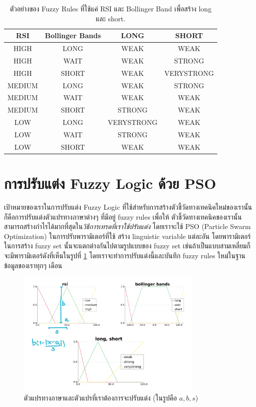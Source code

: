 \begin{table}[htp]
	\centering
	\begin{tabular}{c c c c}
		\toprule
        {RSI} & {Bollinger Bands} & {LONG} & {SHORT} \\ 
        \midrule
        HIGH & LONG & WEAK & WEAK \\
        HIGH & WAIT & WEAK & STRONG \\
        HIGH & SHORT & WEAK & VERYSTRONG \\
        MEDIUM & LONG & WEAK & STRONG \\
        MEDIUM & WAIT & WEAK & WEAK \\
        MEDIUM & SHORT & STRONG & WEAK \\
        LOW & LONG & VERYSTRONG & WEAK \\
        LOW & WAIT & STRONG & WEAK \\
        LOW & SHORT & WEAK & WEAK \\
        \bottomrule
    \end{tabular} 
    \caption{ตัวอย่างของ Fuzzy Rules ที่ใช้แค่ RSI และ Bollinger Band เพื่อสร้าง long และ short.}
	\label{table:1}
\end{table}
\FloatBarrier

\section{การปรับแต่ง Fuzzy Logic ด้วย PSO}
เป้าหมายของเราในการปรับแต่ง Fuzzy Logic ที่ใช้สำหรับการสร้างตัวชี้วัดทางเทคนิคใหม่ของเรานั้น ก็คือการปรับแต่งตัวแปรทางภาษาต่างๆ ที่มีอยู่ fuzzy rules เพื่อให้
ตัวชี้วัดทางเทคนิคของเรานั้นสามารถสร้างกำไรได้มากที่สุดใน\emph{วิธีการเทรดที่เราใช้ปรับแต่ง} โดยเราจะใช้ PSO (Particle Swarm Optimization) ในการปรับพารามิเตอร์ที่ใช้
สร้าง linguistic variable แต่ละอัน โดยพารามิเตอร์ในการสร้าง fuzzy set นั้นจะแตกต่างกันไปตามรูปแบบของ fuzzy set 
เช่นถ้าเป็นแบบสามเหลี่ยมก็จะมีพารามิเตอร์ดังที่เห็นในรูปที่ \ref{fig:9} โดยเราจะทำการปรับแต่งนี้และบันทึก fuzzy rules ใหม่ในฐานข้อมูลของเราทุกๆ เดือน

\begin{figure}[ht]
    \centering
    \includegraphics[width=0.8\textwidth]{images/linguisticv.png}
    \caption{ตัวแปรทางภาษาและตัวแปรที่เราต้องการจะปรับแต่ง (ในรูปคือ $a, b, s$)}
    \label{fig:9}
\end{figure}

